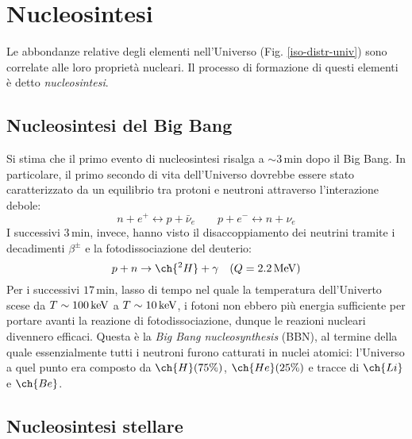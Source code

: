 
\section{Nucleosintesi}

Le abbondanze relative degli elementi nell'Universo (Fig. \ref{iso-distr-univ}) sono correlate alle loro proprietà nucleari. Il processo di formazione di questi elementi è detto \textit{nucleosintesi}.

\subsection{Nucleosintesi del Big Bang}

Si stima che il primo evento di nucleosintesi risalga a $ \sim 3\,\text{min} $ dopo il Big Bang. In particolare, il primo secondo di vita dell'Universo dovrebbe essere stato caratterizzato da un equilibrio tra protoni e neutroni attraverso l'interazione debole:
\begin{equation*}
	n + e^+ \leftrightarrow p + \bar{\nu}_e
	\qquad
	p + e^- \leftrightarrow n + \nu_e
\end{equation*}
I successivi $ 3\,\text{min} $, invece, hanno visto il disaccoppiamento dei neutrini tramite i decadimenti $ \beta^{\pm} $ e la fotodissociazione del deuterio:
\begin{equation*}
	p + n \rightarrow \ch{^2 H} + \gamma \quad (Q = 2.2 \mev)
\end{equation*}
Per i successivi $ 17\,\text{min} $, lasso di tempo nel quale la temperatura dell'Univerto scese da $ T \sim 100 \,\mathrm{keV} $ a $ T \sim 10\,\mathrm{keV} $, i fotoni non ebbero più energia sufficiente per portare avanti la reazione di fotodissociazione, dunque le reazioni nucleari divennero efficaci. Questa è la \textit{Big Bang nucleosynthesis} (BBN), al termine della quale essenzialmente tutti i neutroni furono catturati in nuclei atomici: l'Universo a quel punto era composto da $ \ch{H} (75\%) $, $ \ch{He} (25\%) $ e tracce di $ \ch{Li} $ e $ \ch{Be} $.

\subsection{Nucleosintesi stellare}

